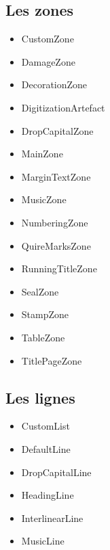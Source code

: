\documentclass[class=article, crop=false]{standalone}
\begin{document}
\subsection{Les zones}
\begin{itemize}
\item CustomZone
\item DamageZone
\item DecorationZone
\item DigitizationArtefact
\item DropCapitalZone
\item MainZone
\item MarginTextZone
\item MusicZone
\item NumberingZone
\item QuireMarksZone
\item RunningTitleZone
\item SealZone
\item StampZone
\item TableZone
\item TitlePageZone
\end{itemize}

\subsection{Les lignes}
\begin{itemize}
\item CustomList
\item DefaultLine
\item DropCapitalLine
\item HeadingLine
\item InterlinearLine
\item MusicLine
\end{itemize}
	
\printbibliography
	
\end{document}
